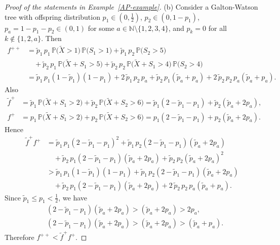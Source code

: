 \documentclass[11pt]{article}
\numberwithin{equation}{section}
\theoremstyle{plain}
\newcommand{\N}{\mathbb N}
\newcommand{\PP}{\mathbb{P}}
\newcommand{\tX}{\tilde{X}}
\begin{document}
\begin{proof}[Proof of the statements in Example~\ref{AP-example}]
\medskip\noindent 
(b) Consider a Galton-Watson tree with offspring distribution $p_1\in (0,\frac{1}{2})$, $p_2\in (0,1-p_1)$, $p_a = 1-p_1-p_2\in (0,1)$ for some $a \in \N\setminus\{1,2,3,4\}$, and $p_k = 0$ for all $k \notin \{1,2,a\}$. Then
\begin{align*}
f^{++}
&=\tilde{p}_1\,p_1\,\PP\big(\tX >1\big)\,\PP\big(S_{1}>1\big)
+\tilde{p}_1\,p_2\,\PP\big(S_{2}>5\big)\\
&\quad +\tilde{p}_2\,p_1\,\PP\big(\tX +S_1 >5\big)
+\tilde{p}_2\,p_2\,\PP\big(\tX +S_1 >4\big)\,\PP\big(S_{2}>4\big) \\
&= \tilde{p}_1\,p_1(1-\tilde{p}_1)(1-p_1)+2\,\tilde{p}_1\,p_2\,p_{a}+\tilde{p}_2\,p_1(\tilde{p}_a+p_a) 
+2\,\tilde{p}_2\,p_2\,p_{a}(\tilde{p}_a+p_a).
\end{align*}
Also
\begin{align*}
\tilde{f}^{+}
&=\tilde{p}_1\,\PP\big(\tX +S_{1} >2\big)+\tilde{p}_2\,\PP\big(\tX +S_{2} >6\big) 
=\tilde{p}_1(2-\tilde{p}_1-p_1)+\tilde{p}_2(\tilde{p}_a+2p_a),\\
f^{+}
&=p_1\,\PP\big(\tX +S_{1} >2\big)+p_2\,\PP\big(\tX +S_{2} >6\big) 
=p_1(2-\tilde{p}_1-p_1)+p_2(\tilde{p}_a+2p_a).
\end{align*}
Hence 
\begin{align*}
\tilde{f}^{+}f^{+}&=\tilde{p}_1\,p_1(2-\tilde{p}_1-p_1)^{2}+\tilde{p}_1\,p_2 (2-\tilde{p}_1-p_1)(\tilde{p}_a+2p_a)\\
&\quad + \tilde{p}_2\,p_{1}(2-\tilde{p}_1-p_1)(\tilde{p}_a+2p_a)+\tilde{p}_2\,p_2 (\tilde{p}_a+2p_a)^2\\
&>
\tilde{p}_1\,p_1(1-\tilde{p}_1)(1-p_1)+\tilde{p}_1\,p_2 (2-\tilde{p}_1-p_1)(\tilde{p}_a+2p_a)\\
&\quad + \tilde{p}_2\,p_{1}(2-\tilde{p}_1-p_1)(\tilde{p}_a+2p_a)+2\,\tilde{p}_2\,p_2\,p_a (\tilde{p}_a+p_a).
\end{align*}
Since $\tilde{p}_1\leq p_1<\frac{1}{2}$, we have
\begin{align*}
&(2-\tilde{p}_1-p_1)(\tilde{p}_a+2p_a)> (\tilde{p}_a+2p_a) > 2p_a,\\
&(2-\tilde{p}_1-p_1)(\tilde{p}_a+2p_a)>(\tilde{p}_a+2p_a)>(\tilde{p}_a+p_a).
\end{align*}
Therefore $f^{++}<\tilde{f}^{+}f^{+}$.
\end{proof}


\end{document}
